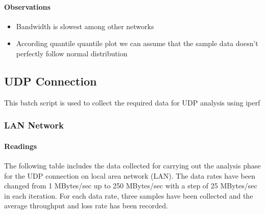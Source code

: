 \documentclass[aps,letterpaper,10pt]{revtex4}
\begin{document}
            \paragraph{Observations}
                \begin{itemize}
                        \item Bandwidth is slowest among other networks
                        \item According quantile quantile plot we can assume that the sample data doesn't perfectly follow normal distribution
                 \end{itemize}

\newpage
    \subsection{UDP Connection}
    This batch script is used to collect the required data for UDP analysis using iperf
        
    	\vspace{3mm}

        \subsubsection{LAN Network}
            \paragraph{Readings}
                The following table includes the data collected for carrying out the analysis phase for the UDP connection on local area network (LAN). The data rates have been changed from 1 MBytes/sec up to 250 MBytes/sec with a step of 25 MBytes/sec in each iteration. For each data rate, three samples have been collected and the average throughput and loss rate has been recorded.
                \begin{figure}[htp]
                    \begin{center}
                    \end{center}    
                \end{figure}            
                \vspace{3mm}
                
\end{document}
